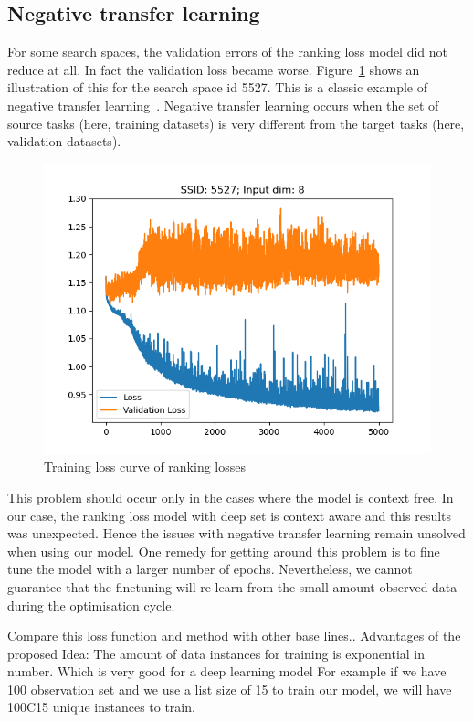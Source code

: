 \documentclass[11pt]{report}
\begin{document}
\subsection{Negative transfer learning}
For some search spaces,  the validation errors of the ranking loss model did not reduce at all.
In fact the validation loss became worse.
Figure~\ref{fig:NegativeLearning} shows an illustration of this for the search space id 5527.
This is a classic example of negative transfer learning~\cite{Weiss2016}.
Negative transfer learning occurs when the set of source tasks (here,  training datasets) is very different from the target tasks (here, validation datasets).

\begin{figure}[htb]
  \centering
    \includegraphics[scale=0.5]{images/NegativeLearning}
    \caption{Training loss curve of ranking losses}
    \label{fig:NegativeLearning}
\end{figure}

This problem should occur only in the cases where the model is context free.
In our case,  the ranking loss model with deep set is context aware and this results was unexpected.
Hence the issues with negative transfer learning remain unsolved when using our model.
One remedy for getting around this problem is to fine tune the model with a larger number of epochs.
Nevertheless,  we cannot guarantee that the finetuning will re-learn from the small amount observed data  during the optimisation cycle.


Compare this loss function and method with other base lines..
Advantages of the proposed Idea:
    The amount of data instances for training is exponential in number. Which is very good for a deep learning model
    For example if we have 100 observation set and we use a list size of 15 to train our model, we will have 100C15
    unique instances to train.
\end{document}

